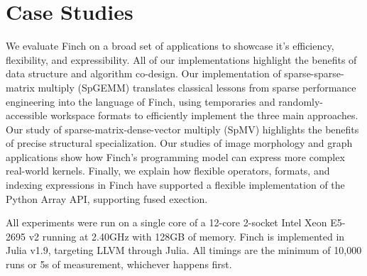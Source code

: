 
\section{Case Studies}

We evaluate Finch on a broad set of applications to showcase it's efficiency,
flexibility, and expressibility. All of our implementations highlight the
benefits of data structure and algorithm co-design.  Our implementation of
sparse-sparse-matrix multiply (SpGEMM) translates classical lessons from sparse
performance engineering into the language of Finch, using temporaries and
randomly-accessible workspace formats to efficiently implement the three main
approaches. Our study of sparse-matrix-dense-vector multiply (SpMV) highlights
the benefits of precise structural specialization. Our studies of image
morphology and graph applications show how Finch's programming model can express more complex
real-world kernels. Finally, we explain
how flexible operators, formats, and indexing expressions in Finch have
supported a flexible implementation of the Python Array API, supporting fused exection.

All experiments were run on a single core of a 12-core 2-socket Intel Xeon E5-2695 v2 running at
2.40GHz with 128GB of memory. Finch is implemented in Julia v1.9, targeting LLVM
through Julia. All timings are the minimum of 10,000 runs or 5s of measurement,
whichever happens first.

